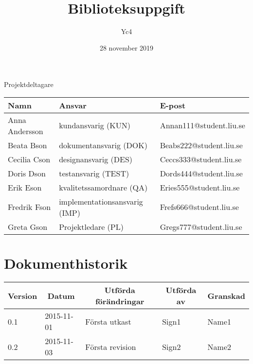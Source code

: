 \documentclass[10pt,oneside,swedish]{lips}
\title{Biblioteksuppgift}
\author{Yc4}
\date{28 november 2019}
\begin{document}
\maketitle

\cleardoublepage
\makeprojectid

\begin{center}
  \Large Projektdeltagare
\end{center}
\begin{center}
  \begin{tabular}{|l|l|l|}
    \hline
    \textbf{Namn} & \textbf{Ansvar} & \textbf{E-post}\\
    \hline
    Anna Andersson & kundansvarig (KUN) & Annan111@student.liu.se\\
    \hline
    Beata Bson & dokumentansvarig (DOK) & Beabs222@student.liu.se\\
    \hline
    Cecilia Cson & designansvarig (DES) & Ceccs333@student.liu.se\\
    \hline
    Doris Dson & testansvarig (TEST) & Dords444@student.liu.se\\
    \hline
    Erik Eson & kvalitetssamordnare (QA) & Eries555@student.liu.se\\
    \hline
    Fredrik Fson & implementationsansvarig (IMP) & Frefs666@student.liu.se\\
    \hline
    Greta Gson & Projektledare (PL) & Gregs777@student.liu.se\\
    \hline
  \end{tabular}
\end{center}


\cleardoublepage
\tableofcontents

\cleardoublepage
\section*{Dokumenthistorik}
\begin{tabular}{p{}|p{}|p{}|p{}|p{}} 
  \multicolumn{1}{c}{\bfseries Version} & 
  \multicolumn{1}{|c}{\bfseries Datum} & 
  \multicolumn{1}{|c}{\bfseries Utförda förändringar} & 
  \multicolumn{1}{|c}{\bfseries Utförda av} & 
  \multicolumn{1}{|c}{\bfseries Granskad}\\
  \hline
  \hline
  0.1 & 2015-11-01 & Första utkast & Sign1 & Name1   \\
  \hline
  0.2 & 2015-11-03 & Första revision & Sign2 & Name2   \\
  \hline
\end{tabular}
\end{document}
